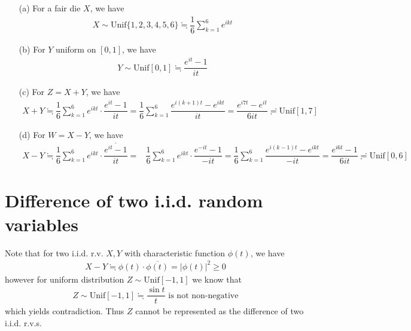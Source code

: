 \documentclass[11pt,a4paper]{article}
\numberwithin{equation}{section}%
\begin{document}
\begin{itemize}[topsep=2pt,itemsep=0pt]
    \item[(a)] For a fair die $ X $, we have
    \begin{align*}
         X\sim \mathrm{ Unif } \{1,2,3,4,5,6\} \fallingdotseq \dfrac{ 1 }{ 6 }\sum_{k=1}^6 e^{ i k t}
    \end{align*}
    \item[(b)] For $ Y $ uniform on $ [0,1] $, we have
    \begin{align*}
        Y\sim \mathrm{ Unif } [0,1] \fallingdotseq \dfrac{ e^{i t}-1 }{ it }  
    \end{align*}
    \item[(c)] For $ Z=X+Y $, we have
    \begin{align*}
        X+Y\fallingdotseq \dfrac{ 1 }{ 6 }\sum_{k=1}^6 e^{ i k t} \cdot \dfrac{ e^{i t}-1 }{ it } =\dfrac{ 1 }{ 6 }\sum_{k=1}^6 \dfrac{ e^{i (k+1) t}-e^{i k t} }{ it } =\dfrac{ e^{i 7 t}-e^{i t} }{ 6it } \risingdotseq \mathrm{ Unif } [1,7] 
    \end{align*}
    \item[(d)] For $ W=X-Y $, we have
    \begin{align*}
        X-Y\fallingdotseq \dfrac{ 1 }{ 6 }\sum_{k=1}^6 e^{ i k t} \cdot \overline{\dfrac{ e^{i t}-1 }{ it }} =& \dfrac{ 1 }{ 6 }\sum_{k=1}^6 e^{ i k t} \cdot \dfrac{ e^{-i t}-1 }{ -it } = \dfrac{ 1 }{ 6 }\sum_{k=1}^6 \dfrac{ e^{i (k-1) t}-e^{i k t} }{ -it } = \dfrac{ e^{i 6 t} -1 }{ 6it } \risingdotseq \mathrm{ Unif }[0,6]
    \end{align*}
\end{itemize}

    
\section{Difference of two i.i.d. random variables}

Note that for two i.i.d. r.v. $ X,Y $ with characteristic function $ \phi(t) $, we have
\begin{align*}
    X-Y\fallingdotseq \phi(t)\cdot \overline{\phi(t)} =|\phi(t)|^2 \geq 0
\end{align*}
however for uniform distribution $ Z\sim \mathrm{ Unif }[-1,1]  $ we know that
\begin{align*}
    Z\sim \mathrm{ Unif }[-1,1] \fallingdotseq \dfrac{ \sin t }{ t } \text{ is not non-negative}
\end{align*}
which yields contradiction. Thus $ Z $ cannot be represented as the difference of two i.i.d. r.v.s.
\end{document}
